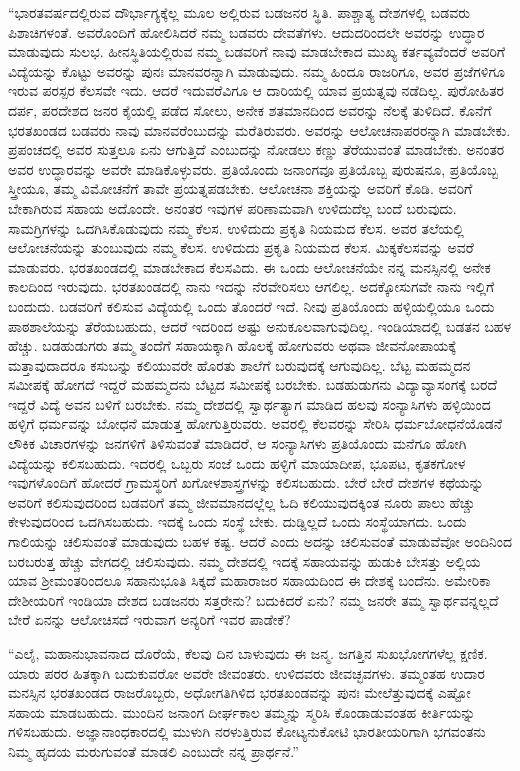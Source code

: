  “ಭಾರತವರ್ಷದಲ್ಲಿರುವ ದೌರ್ಭಾಗ್ಯಕ್ಕೆಲ್ಲ ಮೂಲ ಅಲ್ಲಿರುವ ಬಡಜನರ ಸ್ಥಿತಿ. ಪಾಶ್ಚಾತ್ಯ ದೇಶಗಳಲ್ಲಿ ಬಡವರು ಪಿಶಾಚಿಗಳಂತೆ. ಅವರೊಂದಿಗೆ ಹೋಲಿಸಿದರೆ ನಮ್ಮ ಬಡವರು ದೇವತೆಗಳು. ಆದುದರಿಂದಲೇ ಅವರನ್ನು ಉದ್ಧಾರ ಮಾಡುವುದು ಸುಲಭ. ಹೀನಸ್ಥಿತಿಯಲ್ಲಿರುವ ನಮ್ಮ ಬಡವರಿಗೆ ನಾವು ಮಾಡಬೇಕಾದ ಮುಖ್ಯ ಕರ್ತವ್ಯವೆಂದರೆ ಅವರಿಗೆ ವಿದ್ಯೆಯನ್ನು ಕೊಟ್ಟು ಅವರನ್ನು ಪುನಃ ಮಾನವರನ್ನಾಗಿ ಮಾಡುವುದು. ನಮ್ಮ ಹಿಂದೂ ರಾಜರಿಗೂ, ಅವರ ಪ್ರಜೆಗಳಿಗೂ ಇರುವ ಪರಸ್ಪರ ಕೆಲಸವೇ ಇದು. ಆದರೆ ಇದುವರೆವಿಗೂ ಆ ದಾರಿಯಲ್ಲಿ ಯಾವ ಪ್ರಯತ್ನವು ನಡೆದಿಲ್ಲ. ಪುರೋಹಿತರ ದರ್ಪ, ಪರದೇಶದ ಜನರ ಕೈಯಲ್ಲಿ ಪಡೆದ ಸೋಲು, ಅನೇಕ ಶತಮಾನದಿಂದ ಅವರನ್ನು ನೆಲಕ್ಕೆ ತುಳಿದಿದೆ. ಕೊನೆಗೆ ಭರತಖಂಡದ ಬಡವರು ನಾವು ಮಾನವರೆಂಬುದನ್ನು ಮರೆತಿರುವರು. ಅವರನ್ನು ಆಲೋಚನಾಪರರನ್ನಾಗಿ ಮಾಡಬೇಕು. ಪ್ರಪಂಚದಲ್ಲಿ ಅವರ ಸುತ್ತಲೂ ಏನು ಆಗುತ್ತಿದೆ ಎಂಬುದನ್ನು ನೋಡಲು ಕಣ್ಣು ತೆರೆಯುವಂತೆ ಮಾಡಬೇಕು. ಅನಂತರ ಅವರ ಉದ್ಧಾರವನ್ನು ಅವರೇ ಮಾಡಿಕೊಳ್ಳುವರು. ಪ್ರತಿಯೊಂದು ಜನಾಂಗವೂ ಪ್ರತಿಯೊಬ್ಬ ಪುರುಷನೂ, ಪ್ರತಿಯೊಬ್ಬ ಸ್ತ್ರೀಯೂ, ತಮ್ಮ ವಿಮೋಚನೆಗೆ ತಾವೇ ಪ್ರಯತ್ನಪಡಬೇಕು. ಆಲೋಚನಾ ಶಕ್ತಿಯನ್ನು ಅವರಿಗೆ ಕೊಡಿ. ಅವರಿಗೆ ಬೇಕಾಗಿರುವ ಸಹಾಯ ಅದೊಂದೇ. ಅನಂತರ ಇವುಗಳ ಪರಿಣಾಮವಾಗಿ ಉಳಿದುದೆಲ್ಲ ಬಂದೆ ಬರುವುದು. ಸಾಮಗ್ರಿಗಳನ್ನು ಒದಗಿಸಿಕೊಡುವುದು ನಮ್ಮ ಕೆಲಸ. ಉಳಿದುದು ಪ್ರಕೃತಿ ನಿಯಮದ ಕೆಲಸ. ಅವರ ತಲೆಯಲ್ಲಿ ಆಲೋಚನೆಯನ್ನು ತುಂಬುವುದು ನಮ್ಮ ಕೆಲಸ. ಉಳಿದುದು ಪ್ರಕೃತಿ ನಿಯಮದ ಕೆಲಸ. ಮಿಕ್ಕಕೆಲಸವನ್ನು ಅವರೆ ಮಾಡುವರು. ಭರತಖಂಡದಲ್ಲಿ ಮಾಡಬೇಕಾದ ಕೆಲಸವಿದು. ಈ ಒಂದು ಆಲೋಚನೆಯೇ ನನ್ನ ಮನಸ್ಸಿನಲ್ಲಿ ಅನೇಕ ಕಾಲದಿಂದ ಇರುವುದು. ಭರತಖಂಡದಲ್ಲಿ ನಾನು ಇದನ್ನು ನೆರವೇರಿಸಲು ಆಗಲಿಲ್ಲ. ಅದಕ್ಕೋಸುಗವೇ ನಾನು ಇಲ್ಲಿಗೆ ಬಂದುದು. ಬಡವರಿಗೆ ಕಲಿಸುವ ವಿದ್ಯೆಯಲ್ಲಿ ಒಂದು ತೊಂದರೆ ಇದೆ. ನೀವು ಪ್ರತಿಯೊಂದು ಹಳ್ಳಿಯಲ್ಲಿಯೂ ಒಂದು ಪಾಠಶಾಲೆಯನ್ನು ತೆರೆಯಬಹುದು, ಆದರೆ ಇದರಿಂದ ಅಷ್ಟು ಅನುಕೂಲವಾಗುವುದಿಲ್ಲ. ಇಂಡಿಯಾದಲ್ಲಿ ಬಡತನ ಬಹಳ ಹೆಚ್ಚು. ಬಡಹುಡುಗರು ತಮ್ಮ ತಂದೆಗೆ ಸಹಾಯಕ್ಕಾಗಿ ಹೊಲಕ್ಕೆ ಹೋಗುವರು ಅಥವಾ ಜೀವನೋಪಾಯಕ್ಕೆ ಮತ್ತಾವುದಾದರೂ ಕಸುಬನ್ನು ಕಲಿಯುವರೇ ಹೊರತು ಶಾಲೆಗೆ ಬರುವುದಕ್ಕೆ ಆಗುವುದಿಲ್ಲ. ಬೆಟ್ಟ ಮಹಮ್ಮದನ ಸಮೀಪಕ್ಕೆ ಹೋಗದೆ ಇದ್ದರೆ ಮಹಮ್ಮದನು ಬೆಟ್ಟದ ಸಮೀಪಕ್ಕೆ ಬರಬೇಕು. ಬಡಹುಡುಗನು ವಿದ್ಯಾವ್ಯಾಸಂಗಕ್ಕೆ ಬರದೆ ಇದ್ದರೆ ವಿದ್ಯೆ ಅವನ ಬಳಿಗೆ ಬರಬೇಕು. ನಮ್ಮ ದೇಶದಲ್ಲಿ ಸ್ವಾರ್ಥತ್ಯಾಗ ಮಾಡಿದ ಹಲವು ಸಂನ್ಯಾಸಿಗಳು ಹಳ್ಳಿಯಿಂದ ಹಳ್ಳಿಗೆ ಧರ್ಮವನ್ನು ಬೋಧನೆ ಮಾಡುತ್ತ ಹೋಗುತ್ತಿರುವರು. ಅವರಲ್ಲಿ ಕೆಲವರನ್ನು ಸೇರಿಸಿ ಧರ್ಮಬೋಧನೆಯೊಡನೆ ಲೌಕಿಕ ವಿಚಾರಗಳನ್ನು ಜನಗಳಿಗೆ ತಿಳಿಸುವಂತೆ ಮಾಡಿದರೆ, ಆ ಸಂನ್ಯಾಸಿಗಳು ಪ್ರತಿಯೊಂದು ಮನೆಗೂ ಹೋಗಿ ವಿದ್ಯೆಯನ್ನು ಕಲಿಸಬಹುದು. ಇದರಲ್ಲಿ ಒಬ್ಬರು ಸಂಜೆ ಒಂದು ಹಳ್ಳಿಗೆ ಮಾಯಾದೀಪ, ಭೂಪಟ, ಕೃತಕಗೋಳ ಇವುಗಳೊಂದಿಗೆ ಹೋದರೆ ಗ್ರಾಮಸ್ಥರಿಗೆ ಖಗೋಳಶಾಸ್ತ್ರಗಳನ್ನು ಕಲಿಸಬಹುದು. ಬೇರೆ ಬೇರೆ ದೇಶಗಳ ಕಥೆಯನ್ನು ಅವರಿಗೆ ಕಲಿಸುವುದರಿಂದ ಬಡವರಿಗೆ ತಮ್ಮ ಜೀವಮಾನದಲ್ಲೆಲ್ಲ ಓದಿ ಕಲಿಯುವುದಕ್ಕಿಂತ ನೂರು ಪಾಲು ಹೆಚ್ಚು ಕೇಳುವುದರಿಂದ ಒದಗಿಸಬಹುದು. ಇದಕ್ಕೆ ಒಂದು ಸಂಸ್ಥೆ ಬೇಕು. ದುಡ್ಡಿಲ್ಲದೆ ಒಂದು ಸಂಸ್ಥೆಯಾಗದು. ಒಂದು ಗಾಲಿಯನ್ನು ಚಲಿಸುವಂತೆ ಮಾಡುವುದು ಬಹಳ ಕಷ್ಟ. ಆದರೆ ಎಂದು ಅದನ್ನು ಚಲಿಸುವಂತೆ ಮಾಡುವೆವೋ ಅಂದಿನಿಂದ ಬರಬರುತ್ತ ಹೆಚ್ಚು ವೇಗದಲ್ಲಿ ಚಲಿಸುವುದು. ನಮ್ಮ ದೇಶದಲ್ಲಿ ಇದಕ್ಕೆ ಸಹಾಯವನ್ನು ಹುಡುಕಿ ಬೇಸತ್ತು ಅಲ್ಲಿಯ ಯಾವ ಶ‍್ರೀಮಂತರಿಂದಲೂ ಸಹಾನುಭೂತಿ ಸಿಕ್ಕದೆ ಮಹಾರಾಜರ ಸಹಾಯದಿಂದ ಈ ದೇಶಕ್ಕೆ ಬಂದೆನು. ಅಮೇರಿಕಾ ದೇಶೀಯರಿಗೆ ಇಂಡಿಯಾ ದೇಶದ ಬಡಜನರು ಸತ್ತರೇನು? ಬದುಕಿದರೆ ಏನು? ನಮ್ಮ ಜನರೇ ತಮ್ಮ ಸ್ವಾರ್ಥವನ್ನಲ್ಲದೆ ಬೇರೆ ಏನನ್ನು ಆಲೋಚಿಸದೆ ಇರುವಾಗ ಅನ್ಯರಿಗೆ ಇವರ ಪಾಡೇಕೆ?

 “ಎಲೈ, ಮಹಾನುಭಾವನಾದ ದೊರೆಯೆ, ಕೆಲವು ದಿನ ಬಾಳುವುದು ಈ ಜನ್ಮ. ಜಗತ್ತಿನ ಸುಖಭೋಗಗಳೆಲ್ಲ ಕ್ಷಣಿಕ. ಯಾರು ಪರರ ಹಿತಕ್ಕಾಗಿ ಬದುಕುವರೋ ಅವರೇ ಜೀವಂತರು. ಉಳಿದವರು ಜೀವಚ್ಛವಗಳು. ತಮ್ಮಂತಹ ಉದಾರ ಮನಸ್ಸಿನ ಭರತಖಂಡದ ರಾಜರೊಬ್ಬರು, ಅಧೋಗತಿಗಿಳಿದ ಭರತಖಂಡವನ್ನು ಪುನಃ ಮೇಲೆತ್ತುವುದಕ್ಕೆ ಎಷ್ಟೋ ಸಹಾಯ ಮಾಡಬಹುದು. ಮುಂದಿನ ಜನಾಂಗ ದೀರ್ಘಕಾಲ ತಮ್ಮನ್ನು ಸ್ಮರಿಸಿ ಕೊಂಡಾಡುವಂತಹ ಕೀರ್ತಿಯನ್ನು ಗಳಿಸಬಹುದು. ಅಜ್ಞಾನಾಂಧಕಾರದಲ್ಲಿ ಮುಳುಗಿ ನರಳುತ್ತಿರುವ ಕೋಟ್ಯನುಕೋಟಿ ಭಾರತೀಯರಿಗಾಗಿ ಭಗವಂತನು ನಿಮ್ಮ ಹೃದಯ ಮರುಗುವಂತೆ ಮಾಡಲಿ ಎಂಬುದೇ ನನ್ನ ಪ್ರಾರ್ಥನೆ.” 


